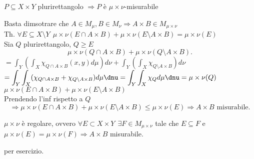 \documentclass[12px]{article}
\begin{document}
\begin{prop}
	$P\subseteq X\times Y$ plurirettangolo  $ \Rightarrow P$ è $\mu\times\nu$-misurabile
\end{prop}
\begin{dimo}
	Basta dimsotrare che $A\in M_\mu, B\in M_\nu \Rightarrow  A\times B\in M_{\mu\times\nu}$ \\
	Th.  $\forall E\subseteq X\setminus Y\ \ \mu\times\nu(E\cap A\times B) + \mu\times \nu (E\setminus A\times B) = \mu\times \nu(E)$\\
	Sia  $Q$ plurirettangolo, $Q\geq E$\\
	 \[
	 \mu\times \nu(Q\cap A\times B) + \mu\times\nu(Q\setminus A\times B)
	 .\] 
	 $\displaystyle = \int_Y \left(\int_X \chi_{Q\cap A\times B} (x,y)d\mu \right)d\nu + \int_Y \left(\int_X \chi_{Q\setminus A\times B} \right)d\nu$\\
	 $\displaystyle = \int_Y\int_X(\chi_{Q\cap A\times B} + \chi_{Q\setminus A\times B} )d\mu\dnu = \int_Y\int_X \chi_Qd\mu\dnu = \mu\times \nu (Q)$ \\
	 $\displaystyle\mu\times\nu (E\cap A\times B) + \mu\times \nu (E\setminus A\times B)$\\ Prendendo l'inf rispetto a  $Q$ \[
		 \Rightarrow  \mu\times\nu(E\cap A\times B) + \mu\times \nu (E\setminus A\times B) \leq\mu\times\nu(E) \Rightarrow  A\times B \text{ misurabile}
	 .\] 
\end{dimo}
\begin{prop}
	$\mu\times \nu$ è regolare, ovvero  $\forall E\subset X\times Y\ \ \exists F\in M_{\mu\times\nu}$ tale che  $E\subseteq F$ e  $\mu\times\nu(E) = \mu\times\nu(F)  \Rightarrow  A\times B$ misurabile.
\end{prop}
\begin{dimo}
	per esercizio.
\end{dimo}

	
\end{document}
